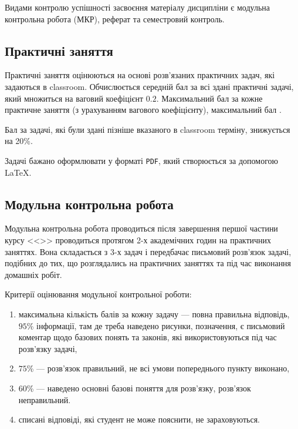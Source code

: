 \documentclass{Syllabus}
\begin{document}
%

Видами контролю успішності засвоєння матеріалу дисципліни є  модульна контрольна робота (МКР), реферат та семестровий контроль.

\subsection*{Практичні заняття}

Практичні заняття оцінюються на основі розв'язаних практичних задач, які задаються в classroom. Обчислюється середній бал за всі здані практичні задачі, який множиться на ваговий коефіцієнт $0.2$. Максимальний бал за кожне практичне заняття \pracBal{} (з урахуванням вагового коефіцієнту), максимальний бал
\xinttheexpr\pracBal*\pracNum\relax.

Бал за задачі, які були здані пізніше вказаного в classroom терміну, знижується на 20\%.

Задачі бажано оформлювати у форматі \texttt{PDF}, який створюється за допомогою \LaTeX.



\subsection*{Модульна контрольна робота}


Модульна контрольна робота проводиться після завершення першої частини курсу <<\discipline>> проводиться протягом 2-х академічних годин на практичних заняттях. Вона складається з $3$-х задач і передбачає письмовий розв’язок задачі, подібних до тих, що розглядались на практичних заняттях та під час виконання домашніх робіт.

Критерії оцінювання модульної контрольної роботи:
\begin{enumerate}[label=$\bullet$]
	\item максимальна кількість балів за кожну задачу --- повна правильна відповідь, $95$\% інформації, там де треба наведено рисунки, позначення, є письмовий коментар щодо базових понять та законів, які використовуються під час розв’язку задачі,
	\item $75$\%  --- розв’язок правильний, не всі умови попереднього пункту виконано,
	\item $60$\%  --- наведено основні базові поняття для розв’язку, розв’язок неправильний.
	\item списані відповіді, які студент не може пояснити, не зараховуються.
\end{enumerate}
\end{document}
